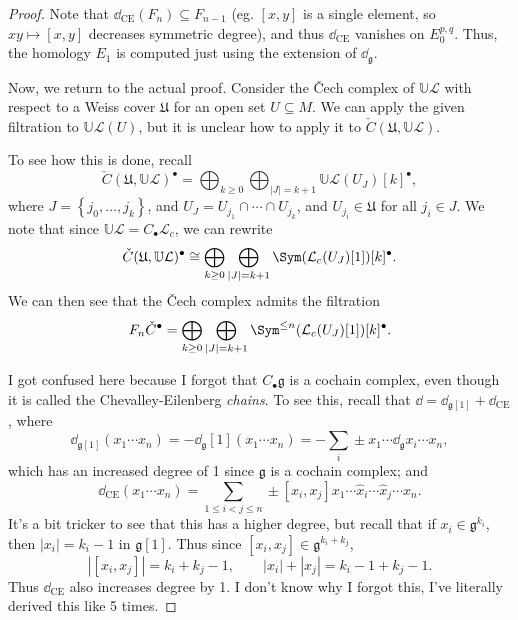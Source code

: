 \begin{proof}
	Note that $\dd _{\mathrm{CE} }(F_n) \subseteq F_{n-1} $ (eg. $[x,y]$ is a single element, so $xy\mapsto [x,y]$ decreases symmetric degree), and thus $\dd _{\mathrm{CE} } $ vanishes on $E^{p,q}_0$. Thus, the homology $E_1$ is computed just using the extension of $\dd _{\mathfrak{g} } $.

	Now, we return to the actual proof. Consider the \v{C}ech complex of $\mathbb{U} \mathcal{L} $ with respect to a Weiss cover $\mathfrak{U} $ for an open set $U\subseteq M$. We can apply the given filtration to $\mathbb{U} \mathcal{L} (U)$, but it is unclear how to apply it to $\check{C}(\mathfrak{U} ,\mathbb{U} \mathcal{L} )$.

	To see how this is done, recall
	\[
		\check{C}(\mathfrak{U} ,\mathbb{U} \mathcal{L} )^{\bullet} = \bigoplus_{k\geq 0} \bigoplus_{\left| J \right| =k+1} \mathbb{U} \mathcal{L} (U_J)[k]^{\bullet},
	\]
	where $J = \left\{ j_0, \ldots , j_k \right\} $, and $U_J = U_{j_1} \cap \cdots \cap U_{j_k} $, and $U_{j_i} \in \mathfrak{U} $ for all $j_i\in J$. We note that since $\mathbb{U} \mathcal{L} =C_{\bullet} \mathcal{L}_c$, we can rewrite
	\[
		\check{C}(\mathfrak{U} ,\mathbb{U} \mathcal{L} )^{\bullet} \cong \bigoplus_{k\geq 0} \bigoplus_{\left| J \right| =k+1} \Sym (\mathcal{L}_c(U_J)[1])[k]^{\bullet}
	.\]
	We can then see that the \v{C}ech complex admits the filtration
	\[
		F_n\check{C}^{\bullet}  = \bigoplus_{k\geq 0}\bigoplus_{\left| J \right| =k+1} \Sym ^{\leq n} (\mathcal{L} _c(U_J)[1])[k]^{\bullet}
	.\]
	
	I got confused here because I forgot that $C_{\bullet} \mathfrak{g} $ is a cochain complex, even though it is called the Chevalley-Eilenberg \emph{chains}. To see this, recall that $\dd =\dd _{\mathfrak{g}[1]} +\dd _{\mathrm{CE} } $, where
	\[
		\dd _{\mathfrak{g}[1]} (x_1 \cdots x_n) =-\dd _{\mathfrak{g} } [1](x_1 \cdots x_n)= -\sum_{i} \pm x_1 \cdots \dd _{\mathfrak{g} }x_i \cdots x_n,
	\]
	which has an increased degree of 1 since $\mathfrak{g} $ is a cochain complex; and
	\[
		\dd _{\mathrm{CE} } (x_1\cdots x_n) = \sum_{1\leq i<j\leq n}\pm [x_i,x_j] x_1\cdots \widehat{x}_i \cdots \widehat{x} _j \cdots x_n
	.\]
	It's a bit tricker to see that this has a higher degree, but recall that if $x_i\in \mathfrak{g}^{k_i} $, then $\left| x_i \right| =k_i - 1$ in $\mathfrak{g} [1]$. Thus since $[x_i,x_j]\in \mathfrak{g} ^{k_i+k_j} $,
	\[
		\left| [x_i,x_j] \right| =k_i + k_j - 1,\qquad \left| x_i \right| +\left| x_j \right| = k_i - 1 + k_j - 1
	.\]
	Thus $\dd _{\mathrm{CE} } $ also increases degree by 1. I don't know why I forgot this, I've literally derived this like 5 times.


\end{proof}
